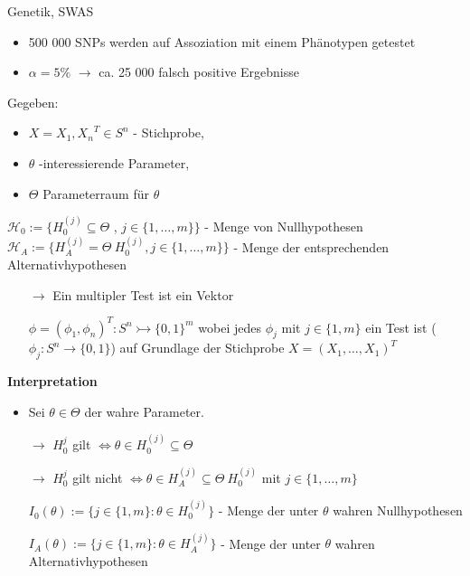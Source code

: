 \begin{exmp}
	Genetik, SWAS
	\begin{itemize}
		\item 500 000 SNPs werden auf Assoziation mit einem Phänotypen getestet
		\item $\alpha = 5\%$ $\rightarrow$ ca. 25 000 falsch positive Ergebnisse
	\end{itemize}
\end{exmp}
\newpage
Gegeben:
\begin{itemize}
	\item $X= {X_1, X_n}^T \in S^n$ - Stichprobe,
	\item $\theta$ -interessierende Parameter,
	\item $\Theta$ Parameterraum für $\theta$
\end{itemize}
$\mathcal{H}_0 := \{ H_0^{(j)} \subseteq \Theta$ , $j \in \{1, \ldots, m\} \}$ - Menge von Nullhypothesen\\
$\mathcal{H}_A := \{ H_A^(j) = \Theta \ H_0^{(j)} , j \in \{1, \ldots, m\}\}$ - Menge der entsprechenden Alternativhypothesen
\begin{itemize}
	\item[$\rightarrow$] Ein multipler Test ist ein Vektor 
	\item[]$\phi = (\phi_1, \phi_n)^T: S^n \rightarrowtail \{0,1\}^m$ 
wobei jedes $\phi_j$ mit $j \in \{1,m\}$ ein Test ist ($\phi_j: S^n \rightarrow \{0,1\}$) auf Grundlage der Stichprobe $X = (X_1,\ldots, X_1)^T$
\end{itemize}
\textbf{Interpretation}
\begin{itemize}
	\item Sei $\theta \in \Theta$ der wahre Parameter.
	\item[$\rightarrow$] $H_0^{j}$  gilt $\Leftrightarrow \theta \in H_0^{(j)} \subseteq \Theta$
	\item[$\rightarrow$] $H_0^{j}$ gilt nicht $\Leftrightarrow \theta \in H_A^{(j)} \subseteq \Theta \ H_0^{(j)} $
mit $j \in \{1,\ldots,m\}$
	\item[]$I_0(\theta) := \{j \in \{1,m\} : \theta \in H_0^{(j)} \}$ - Menge der unter $\theta$ wahren Nullhypothesen
	\item[]$I_A(\theta) := \{j \in \{1,m\} : \theta \in H_A^{(j)} \}$ - Menge der unter $\theta$ wahren Alternativhypothesen
\end{itemize}

